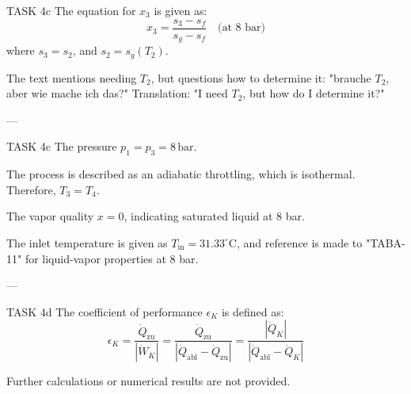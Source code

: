 TASK 4c  
The equation for \( x_3 \) is given as:  
\[
x_3 = \frac{s_3 - s_f}{s_g - s_f} \quad \text{(at 8 bar)}
\]  
where \( s_3 = s_2 \), and \( s_2 = s_g(T_2) \).  

The text mentions needing \( T_2 \), but questions how to determine it:  
"brauche \( T_2 \), aber wie mache ich das?"  
Translation: "I need \( T_2 \), but how do I determine it?"

---

TASK 4c  
The pressure \( p_1 = p_3 = 8 \, \text{bar} \).  

The process is described as an adiabatic throttling, which is isothermal. Therefore, \( T_3 = T_4 \).  

The vapor quality \( x = 0 \), indicating saturated liquid at 8 bar.  

The inlet temperature is given as \( T_{\text{in}} = 31.33^\circ\text{C} \), and reference is made to "TABA-11" for liquid-vapor properties at 8 bar.

---

TASK 4d  
The coefficient of performance \( \epsilon_K \) is defined as:  
\[
\epsilon_K = \frac{\dot{Q}_{\text{zu}}}{|\dot{W}_K|} = \frac{\dot{Q}_{\text{zu}}}{|\dot{Q}_{\text{abl}} - \dot{Q}_{\text{zu}}|} = \frac{|\dot{Q}_K|}{|\dot{Q}_{\text{abl}} - \dot{Q}_K|}
\]  

Further calculations or numerical results are not provided.
